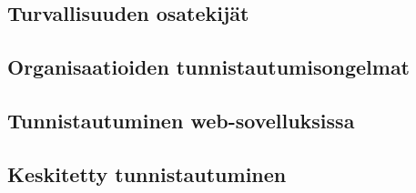 
\subsection{Turvallisuuden osatekijät}

\subsection{Organisaatioiden tunnistautumisongelmat}

\subsection{Tunnistautuminen web-sovelluksissa}

\subsection{Keskitetty tunnistautuminen}
